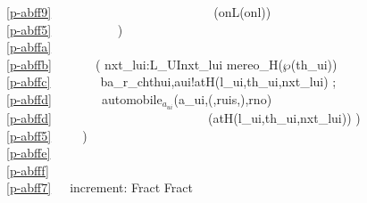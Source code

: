 {\ref{p-abff9}\ \ \ \ \ \ \ \ \ \ \ \ \ \ \ \ \ \ \ \ \ \ \ \ \ \ (onL(onl))\ \ \\
\ref{p-abff5}\ \ \ \ \ \ \ \ \ \  )\ \ \\
\ref{p-abffa}\ \ \ \ \ \  \\
\ref{p-abffb}\ \ \ \ \ \ \ ( nxt\_lui:L\_UI{\RDOT}nxt\_lui {\ISIN} mereo\_H($\wp$(th\_ui)) \\
\ref{p-abffc}\ \ \ \ \ \ \ \ ba\_r\_ch{\LBRACKET}thui,aui{\RBRACKET}!atH(l\_ui,th\_ui,nxt\_lui) ;\\
\ref{p-abffd}\ \ \ \ \ \ \ \ automobile$_{a_{ui}}$(a\_ui,({\LBRACE}{\RBRACE},ruis,{\LBRACE}{\RBRACE}),rno)\\
\ref{p-abffd}\ \ \ \ \ \ \ \ \ \ \ \ \ \ \ \ \ \ \ \ \ \ \ \ \ (atH(l\_ui,th\_ui,nxt\_lui)) )\ \ \ \ \ \ \ \\
\ref{p-abff5}\ \ \ \ \ )\\
\ref{p-abffe}\ \ \ \ \ {\NONDETCHOICE}\\
\ref{p-abfff}\ \ \ \ \ \ \ \ \\
\ref{p-abff7}\ \ \ increment: Fract {\RIGHTARROW} Fract\ \ \ 
\ep
\emcii


}
